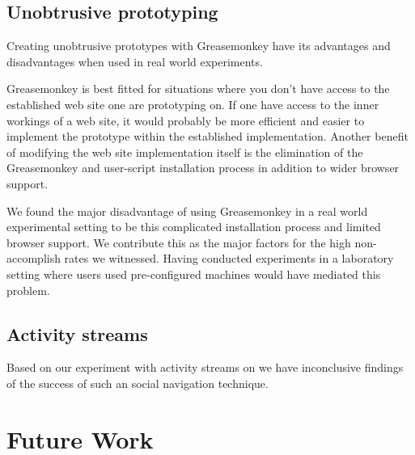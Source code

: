 \subsection{Unobtrusive prototyping}

Creating unobtrusive prototypes with Greasemonkey have its advantages and
disadvantages when used in real world experiments.

Greasemonkey is best fitted for situations where you don't have access to the
established web site one are prototyping on. If one have access to the inner
workings of a web site, it would probably be more efficient and easier to
implement the prototype within the established implementation. Another benefit
of modifying the web site implementation itself is the elimination of the
Greasemonkey and user-script installation process in addition to wider browser
support.

We found the major disadvantage of using Greasemonkey in a real world
experimental setting to be this complicated installation process and limited
browser support. We contribute this as the major factors for the high
non-accomplish rates we witnessed. Having conducted experiments in a
laboratory setting where users used pre-configured machines would have
mediated this problem.

\subsection{Activity streams}

Based on our experiment with activity streams on \urort{} we have inconclusive
findings of the success of such an social navigation technique.

\section{Future Work}




